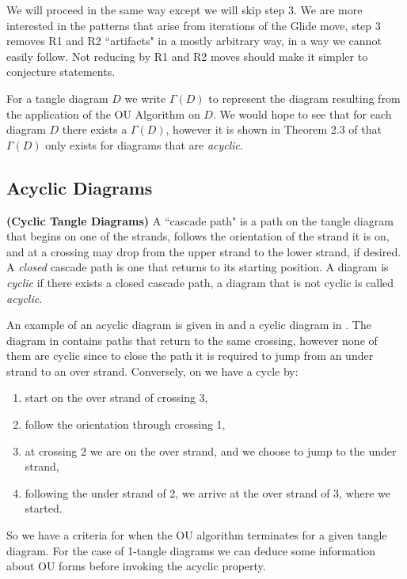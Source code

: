 We will proceed in the same way except we will skip step 3. We are more interested in the patterns that arise from iterations of the Glide move, step 3 removes R1 and R2 ``artifacts" in a mostly arbitrary way, in a way we cannot easily follow. Not reducing by R1 and R2 moves should make it simpler to conjecture statements.

For a tangle diagram $D$ we write $\Gamma(D)$ to represent the diagram resulting from the application of the OU Algorithm on $D$. We would hope to see that for each diagram $D$ there exists a $\Gamma(D)$, however it is shown in Theorem 2.3 of \citep{barnatan2020tangles}  that $\Gamma(D)$ only exists for diagrams that are \textit{acyclic}.  

\subsection{Acyclic Diagrams}

\begin{definition}\textbf{(Cyclic Tangle Diagrams)}
A ``cascade path" is a path on the tangle diagram that begins on one of the strands, follows the orientation of the strand it is on, and at a crossing may drop from the upper strand to the lower strand, if desired. A \textit{closed} cascade path is one that returns to its starting position. A diagram is \textit{cyclic} if there exists a closed cascade path, a diagram that is not cyclic is called \textit{acyclic}. 
\end{definition}

An example of an acyclic diagram is given in  and a cyclic diagram in . The diagram in  contains paths that return to the same crossing, however none of them are cyclic since to close the path it is required to jump from an under strand to an over strand. Conversely, on  we have a cycle by:
\begin{enumerate}
\item start on the over strand of crossing 3,
\item follow the orientation through crossing 1,
\item at crossing 2 we are on the over strand, and we choose to jump to the under strand,
\item following the under strand of 2, we arrive at the over strand of 3, where we started.
\end{enumerate}

So we have a criteria for when the OU algorithm terminates for a given tangle diagram. For the case of 1-tangle diagrams we can deduce some information about OU forms before invoking the acyclic property.

